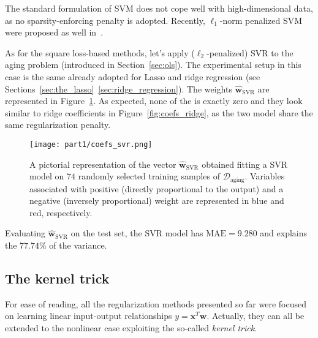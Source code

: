			The standard formulation of SVM does not cope well with high-dimensional data, as no sparsity-enforcing penalty is adopted. Recently, $\ell_1$-norm penalized SVM were proposed as well in~\cite{zhu20041, peng2016error}.

			As for the square loss-based methods, let's apply ($\ell_2$-penalized) SVR to the aging problem (introduced in Section~\ref{sec:ols}).
			The experimental setup in this case is the same already adopted for Lasso and ridge regression (see Sections~\ref{sec:the_lasso}~\ref{sec:ridge_regression}).
			The weights $\bm{\hat w}_{\text{SVR}}$ are represented in Figure~\ref{fig:coefs_svr}. As expected, none of the is exactly zero and they look similar to ridge coefficients in Figure~\ref{fig:coefs_ridge}, as the two model share the same regularization penalty.
			\begin{figure}[!h]
				\centering
				\texttt{[image: part1/coefs\_svr.png]}
				\caption{A pictorial representation of the vector $\bm{\hat w}_{\text{SVR}}$ obtained fitting a SVR model on $74$ randomly selected training samples of $\mathcal{D}_{\text{aging}}$. Variables associated with positive (\ie directly proportional to the output) and a negative (\ie inversely proportional) weight are represented in blue and red, respectively.} \label{fig:coefs_svr}
			\end{figure}
			Evaluating $\bm{\hat w}_{\text{SVR}}$ on the test set, the SVR model has $\text{MAE}=9.280$ and explains the $77.74\%$ of the variance.


			\subsection{The kernel trick} \label{sec:kernel_trick}
			For ease of reading, all the regularization methods presented so far were focused on learning linear input-output relationships $y = \bm{x}^T\bm{w}$. Actually, they can all be extended to the nonlinear case exploiting the so-called \textit{kernel trick}.

